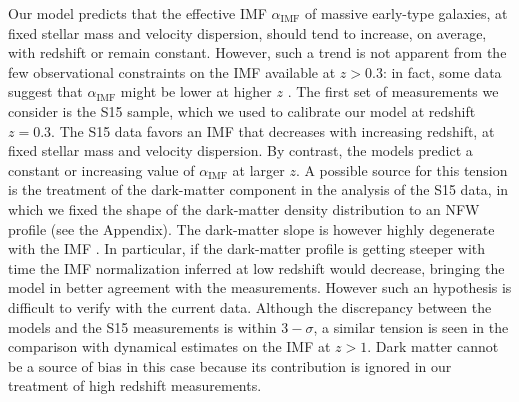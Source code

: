 \documentclass[usenatbib]{mnras}
\def\aimf{\alpha_{\mathrm{IMF}}}
\begin{document}
Our model predicts that the effective IMF $\aimf$ of massive
  early-type galaxies, at fixed stellar mass and velocity dispersion, should tend to increase, on average, with
  redshift or remain constant. However, such a trend is not apparent
  from the few observational constraints on the IMF available at
  $z>0.3$: in fact, some data suggest that $\aimf$ might be lower at higher
  $z$ \citep[see also][]{Tor++14}. The first set of measurements we consider is the S15 sample,
which we used to calibrate our model at redshift $z=0.3$. The S15 data
favors an IMF that decreases with increasing redshift, at fixed
stellar mass and velocity dispersion. By contrast, the models predict
a constant or increasing value of $\aimf$ at larger $z$.  A possible
source for this tension is the treatment of the dark-matter component
in the analysis of the S15 data, in which we fixed the shape of
  the dark-matter density distribution to an NFW profile (see the
  Appendix). The dark-matter slope is however highly degenerate with
the IMF \citep[see e.g.][]{Aug++10}. In particular, if the
  dark-matter profile is getting steeper with time the IMF
  normalization inferred at low redshift would decrease, bringing the
  model in better agreement with the measurements. However such an
  hypothesis is difficult to verify with the current data.  Although
  the discrepancy between the models and the S15 measurements is
  within $3-\sigma$, a similar tension is seen in the comparison with
  dynamical estimates on the IMF at $z>1$.  Dark matter cannot be a
  source of bias in this case because its contribution is ignored in
  our treatment of high redshift measurements.

\end{document}
